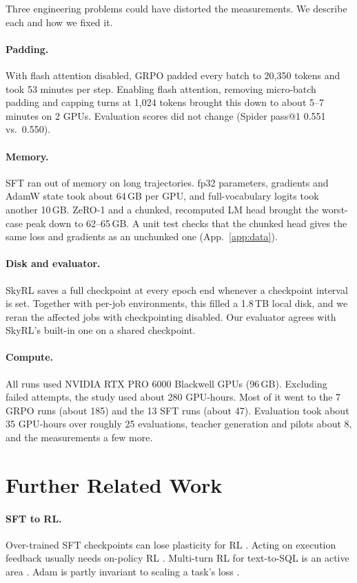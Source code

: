 Three engineering problems could have distorted the measurements. We describe each and how we fixed it.

\paragraph{Padding.} With flash attention disabled, GRPO padded every batch to 20,350 tokens and took 53 minutes per step. Enabling flash attention, removing micro-batch padding and capping turns at 1,024 tokens brought this down to about 5--7 minutes on 2 GPUs. Evaluation scores did not change (Spider pass@1 0.551 vs.\ 0.550).

\paragraph{Memory.} SFT ran out of memory on long trajectories. fp32 parameters, gradients and AdamW state took about 64\,GB per GPU, and full-vocabulary logits took another 10\,GB. ZeRO-1 and a chunked, recomputed LM head brought the worst-case peak down to 62--65\,GB. A unit test checks that the chunked head gives the same loss and gradients as an unchunked one (App.~\ref{app:data}).

\paragraph{Disk and evaluator.} SkyRL saves a full checkpoint at every epoch end whenever a checkpoint interval is set. Together with per-job environments, this filled a 1.8\,TB local disk, and we reran the affected jobs with checkpointing disabled. Our evaluator agrees with SkyRL's built-in one on a shared checkpoint.

\paragraph{Compute.} All runs used NVIDIA RTX PRO 6000 Blackwell GPUs (96\,GB). Excluding failed attempts, the study used about 280 GPU-hours. Most of it went to the 7 GRPO runs (about 185) and the 13 SFT runs (about 47). Evaluation took about 35 GPU-hours over roughly 25 evaluations, teacher generation and pilots about 8, and the measurements a few more.

\section{Further Related Work}
\label{app:morerelated}
\paragraph{SFT to RL.}
Over-trained SFT checkpoints can lose plasticity for RL \citep{plasticity2026}. Acting on execution feedback usually needs on-policy RL \citep{gehring2024rlef,kumar2024score}. Multi-turn RL for text-to-SQL is an active area \citep{xu2025mtirsql,liu2026serlsql}. Adam is partly invariant to scaling a task's loss \citep{elich2023mtl,kurin2022unitary}.

